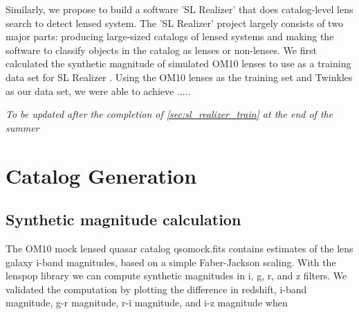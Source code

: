 \documentclass[\docopts]{\docclass}
\begin{document}
Similarly, we propose to build a software 'SL Realizer' that does catalog-level lens search to detect lensed system. The 'SL Realizer' project largely consists of two major parts: producing large-sized catalogs of lensed systems and making the software to classify objects in the catalog as lenses or non-lenses. We first calculated the synthetic magnitude of simulated OM10 lenses to use as a training data set for SL Realizer \citep{OM10}. Using the OM10 lenses as the training set and Twinkles \cite{Twinkles} as our data set, we were able to achieve ..... 

\textit{To be updated after the completion of \ref{sec:sl_realizer_train} at the end of the summer}






\section{Catalog Generation}
\subsection{Synthetic magnitude calculation}
\label{sssec:Synthetic}

The OM10 mock lensed quasar catalog qso\textunderscore mock.fits contains estimates of the lens galaxy i-band magnitudes, based on a simple Faber-Jackson scaling. With the lenspop library we can compute synthetic magnitudes in i, g, r, and z filters. We validated the computation by plotting the difference in redshift,  i-band magnitude, g-r magnitude, r-i magnitude, and i-z magnitude when
\end{document}
